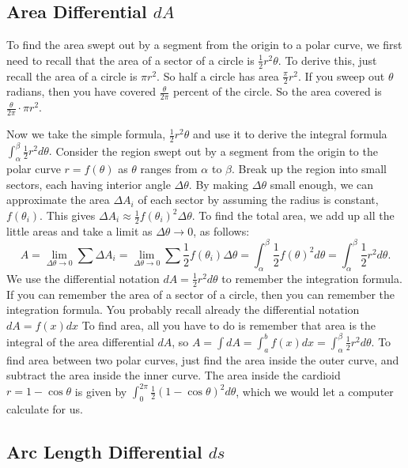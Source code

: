 {{{{{{{\subsection{Area Differential $dA$}

To find the area swept out by a segment from the origin to a polar curve, we first need to recall that the area of a sector of a circle is $\displaystyle \frac 12 r^2 \theta$. To derive this, just recall the area of a circle is  $\pi r^2$. So half a circle has area $\displaystyle \frac{\pi}{2}r^2$. If you sweep out $\theta$ radians, then you have covered $\displaystyle \frac{\theta}{2\pi}$ percent of the circle. So the area covered is $\displaystyle \frac{\theta}{2\pi}\cdot \pi r^2$.  

Now we take the simple formula, $\displaystyle \frac 12 r^2 \theta$ and use it to derive the integral formula $ \int_\alpha^\beta \frac 12 r^2 d\theta.$ Consider the region swept out by a segment from the origin to the polar curve $r=f(\theta)$ as $\theta$ ranges from $\alpha$ to $\beta$. Break up the region into small sectors, each having interior angle $\Delta \theta$. By making $\Delta \theta$ small enough, we can approximate the area $\Delta A_i$ of each sector by assuming the radius is constant, $f(\theta_i)$.  This gives $\Delta A_i\approx \frac12 f(\theta_i)^2 \Delta \theta$. To find the total area, we add up all the little areas and take a limit as $\Delta \theta\to 0$, as follows: $$A = \lim_{\Delta \theta\to 0} \sum\Delta A_i
=\lim_{\Delta \theta\to 0} \sum\frac12 f(\theta_i)\Delta \theta
=\int_\alpha^\beta \frac12 f(\theta)^2d \theta
=\int_\alpha^\beta \frac12 r^2d \theta.
$$
We use the differential notation 
$dA=\frac{1}{2}r^2d\theta$ to remember the integration formula.  If you can remember the area of a sector of a circle, then you can remember the integration formula.  You probably recall already the differential notation
$dA=f(x)dx$
To find area, all you have to do is remember that area is the integral of the area differential $dA$, so $A=\int dA = \int_a^b f(x)dx = \int_\alpha^\beta\frac{1}{2}r^2d\theta. $ To find area between two polar curves, just find the area inside the outer curve, and subtract the area inside the inner curve. The area inside the cardioid $r=1-\cos\theta$ is given by $\int_0^{2\pi}\frac{1}{2}(1-\cos\theta)^2d\theta$, which we would let a computer calculate for us.
 
\subsection{Arc Length Differential $ds$}


}}}}}}}
